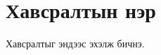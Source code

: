 
\chapter{Хавсралтын нэр} %

\label{AppendixA} %
\pagecolor{white}



Хавсралтыг эндээс эхэлж бичнэ. 

